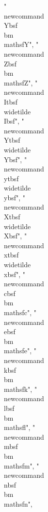 {"\\newcommand{\\Ybsf}{\\bm{\\mathsf{Y}}}",
"\\newcommand{\\Zbsf}{\\bm{\\mathsf{Z}}}",
"\\newcommand{\\Itbsf}{\\widetilde{\\Ibsf}}",
"\\newcommand{\\Ytbsf}{\\widetilde{\\Ybsf}}",
"\\newcommand{\\ytbsf}{\\widetilde{\\ybsf}}",
"\\newcommand{\\Xtbsf}{\\widetilde{\\Xbsf}}",
"\\newcommand{\\xtbsf}{\\widetilde{\\xbsf}}",
"\\newcommand{\\cbsf}{\\bm{\\mathsf{c}}}",
"\\newcommand{\\ebsf}{\\bm{\\mathsf{e}}}",
"\\newcommand{\\kbsf}{\\bm{\\mathsf{k}}}",
"\\newcommand{\\lbsf}{\\bm{\\mathsf{l}}}",
"\\newcommand{\\mbsf}{\\bm{\\mathsf{m}}}",
"\\newcommand{\\nbsf}{\\bm{\\mathsf{n}}}",
}
